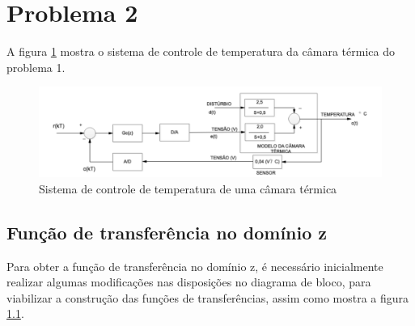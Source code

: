 \documentclass[a4paper,12pt]{article}
\begin{document}
	\section{Problema 2}
		A figura \ref{fig:plantaproblema2} mostra o sistema de controle de temperatura da câmara térmica do problema 1.
		
		\begin{figure}[H]
			\centering
			\includegraphics[width=0.9\linewidth]{images/planta_problema2.png}
			\caption{Sistema de controle de temperatura de uma câmara térmica}
			\label{fig:plantaproblema2}
		\end{figure}
	
		\subsection{Função de transferência no domínio z}	
			Para obter a função de transferência no domínio z, é necessário inicialmente realizar algumas modificações nas disposições no diagrama de bloco, para viabilizar a construção das funções de transferências, assim como mostra a figura \ref{}.
\end{document}
